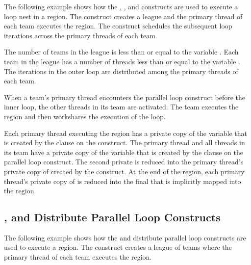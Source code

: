 The following example shows how the , , and  
constructs are used to execute a loop nest in a  region. The  
construct creates a league and the primary thread of each team executes the  
region. The  construct schedules the subsequent loop iterations 
across the primary threads of each team.

The number of teams in the league is less than or equal to the variable . 
Each team in the league has a number of threads less than or equal to the variable 
. The iterations in the outer loop are distributed among the primary 
threads of each team.

When a team's primary thread encounters the parallel loop construct before the inner 
loop, the other threads in its team are activated. The team executes the  
region and then workshares the execution of the loop.


Each primary thread executing the  region has a private copy of the 
variable  that is created by the  clause on the  construct. 
The primary thread and all threads in its team have a private copy of the variable 
 that is created by the  clause on the parallel loop construct. 
The second private  is reduced into the primary thread's private copy of  
created by the  construct. At the end of the  region, 
each primary thread's private copy of  is reduced into the final  that is 
implicitly mapped into the  region.



\subsection{, and Distribute Parallel Loop Constructs}
\label{subsec:teams_distribute_parallel}

The following example shows how the  and distribute 
parallel loop constructs are used to execute a  region. 
The  construct creates a league of teams where the primary thread of each 
team executes the  region.

